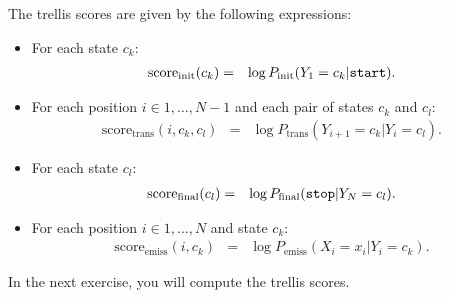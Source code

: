 The trellis scores are given by the following expressions:
\begin{itemize}
\item For each state $c_k$:
\begin{eqnarray}
\mathrm{score}_{\mathrm{init}}(c_k) &=&
\log P_{\mathrm{init}}(Y_{1} = c_k | \text{\tt start}).
\end{eqnarray}
\item For each position $i \in {1,\ldots,N-1}$ and each pair of states $c_k$ and $c_l$:
\begin{eqnarray}
\mathrm{score}_{\mathrm{trans}}(i, c_k, c_l) &=&
\log P_{\mathrm{trans}}(Y_{i+1} = c_k | Y_i = c_l).
\end{eqnarray}
\item For each state $c_l$:
\begin{eqnarray}
\mathrm{score}_{\mathrm{final}}(c_l) &=&
\log P_{\mathrm{final}}(\text{\tt stop} | Y_N = c_l).
\end{eqnarray}
\item For each position $i \in {1,\ldots,N}$ and state $c_k$:
\begin{eqnarray}
\mathrm{score}_{\mathrm{emiss}}(i, c_k) &=&
\log P_{\mathrm{emiss}}(X_i = x_i | Y_i = c_k).
\end{eqnarray}
\end{itemize}

In the next exercise, you will compute the trellis scores.

